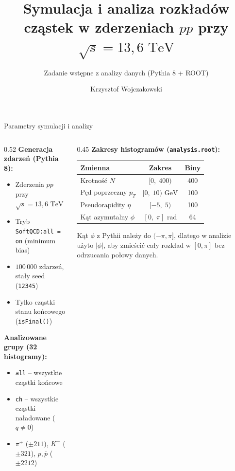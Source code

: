 \documentclass[aspectratio=169, 10pt]{beamer}
\title{Symulacja i analiza rozkładów cząstek w zderzeniach $pp$ przy $\sqrt{s} = 13{,}6\text{ TeV}$}
\subtitle{Zadanie wstępne z analizy danych (Pythia 8 + ROOT)}
\author{Krzysztof Wojczakowski}
\institute{Wydział Matematyki i Nauk Informacyjnych, Politechnika Warszawska}
\date{}
\begin{document}
\begin{frame}[plain]
  \titlepage
\end{frame}

\begin{frame}{Parametry symulacji i analizy}
  \begin{columns}[T, onlytextwidth]
    \begin{column}{0.52\textwidth}
      \textbf{Generacja zdarzeń (Pythia 8):}
      \begin{itemize}
        \item Zderzenia $pp$ przy $\sqrt{s} = 13{,}6\text{ TeV}$
        \item Tryb \texttt{SoftQCD:all = on} (minimum bias)
        \item $100\,000$ zdarzeń, stały seed (\texttt{12345})
        \item Tylko cząstki stanu końcowego (\texttt{isFinal()})
      \end{itemize}

      \vspace{0.5em}
      \textbf{Analizowane grupy (32 histogramy):}
      \begin{itemize}
        \item \texttt{all} -- wszystkie cząstki końcowe
        \item \texttt{ch} -- wszystkie cząstki naładowane ($q \neq 0$)
        \item $\pi^\pm$ ($\pm 211$), $K^\pm$ ($\pm 321$), $p,\bar{p}$ ($\pm 2212$)
      \end{itemize}
    \end{column}

    \begin{column}{0.45\textwidth}
      \textbf{Zakresy histogramów (\texttt{analysis.root}):}
      \vspace{0.5em}
      \begin{table}
        \centering
        \small
        \begin{tabular}{@{}lcc@{}}
          \toprule
          Zmienna & Zakres & Biny \\
          \midrule
          Krotność $N$ & $[0,\; 400)$ & 400 \\
          Pęd poprzeczny $p_T$ & $[0,\; 10)\text{ GeV}$ & 100 \\
          Pseudorapidity $\eta$ & $[-5,\; 5)$ & 100 \\
          Kąt azymutalny $\phi$ & $[0,\; \pi]\text{ rad}$ & 64 \\
          \bottomrule
        \end{tabular}
      \end{table}

      \vspace{0.4em}
      \footnotesize
      Kąt $\phi$ z Pythii należy do $(-\pi, \pi]$, dlatego w analizie użyto $|\phi|$, aby zmieścić cały rozkład w $[0, \pi]$ bez odrzucania połowy danych.
    \end{column}
  \end{columns}
\end{frame}
\end{document}

